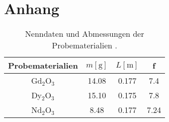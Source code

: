 \section{Anhang}


\begin{table}
    \caption{Nenndaten und Abmessungen der Probematerialien \cite{skript}.}
    \centering
    \label{tab:proben}
    \begin{tabular}{c || c c c}
        \toprule
        \tiny Probematerialien & $m [\si{\gram}]$ & $L [\si{\meter}]$ & f\\
        \midrule
        Gd$_2$O$_3$ & 14.08 & 0.177 & 7.4 \\
        \midrule
        Dy$_2$O$_3$ & 15.10 & 0.175 & 7.8 \\
        \midrule
        Nd$_2$O$_3$ & 8.48  & 0.177 & 7.24 \\
        \bottomrule    
    \end{tabular}
\end{table}

